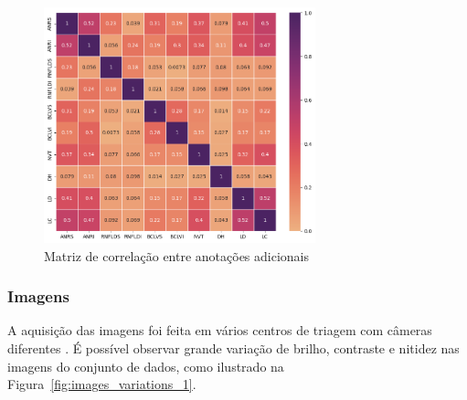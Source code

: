 \documentclass[12pt]{article}
\begin{document}
\begin{figure}[htb]
 \centering
 \includegraphics[width=0.7\textwidth]{images/correlation.png}
 \caption{Matriz de correlação entre anotações adicionais}
 \label{fig:labels_correlation}
\end{figure}

\subsubsection{Imagens}
\label{sec:dataset:images}

A aquisição das imagens foi feita em vários centros de triagem com câmeras diferentes \cite{justraigs_article}.
É possível observar grande variação de brilho, contraste e nitidez nas imagens do conjunto de dados, como ilustrado na Figura~\ref{fig:images_variations_1}.
\end{document}
